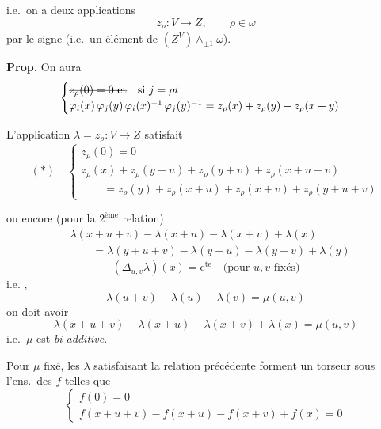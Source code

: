 \documentclass[11pt,a4paper]{article}
\begin{document}
i.e.\ on a deux applications
\[
z_\rho : V \longrightarrow Z, \qquad \rho \in \omega
\]
 par le signe (i.e.\ un élément de $(Z^V) \wedge_{\pm 1} \omega$). 

\textbf{Prop.} On aura
\[
\begin{cases}
\text{\struck{$z_\rho(0) = 0$ et}} \quad \text{si } j = \rho i\\
\varphi_i(x)\, \varphi_j(y)\, \varphi_i(x)^{-1}\, \varphi_j(y)^{-1} = z_\rho(x) + z_\rho(y) - z_\rho(x + y)
\end{cases}
\]

L'application $\lambda = z_\rho : V \to Z$ satisfait
\[
(*)\quad
\begin{cases}
z_\rho(0) = 0\\
z_\rho(x) + z_\rho(y + u) + z_\rho(y + v) + z_\rho(x + u + v)\\
\qquad = z_\rho(y) + z_\rho(x + u) + z_\rho(x + v) + z_\rho(y + u + v)
\end{cases}
\]


ou encore (pour la $2^{\text{ème}}$ relation)
\[
\begin{aligned}
&\lambda(x + u + v) - \lambda(x + u) - \lambda(x + v) + \lambda(x)\\
&\qquad = \lambda(y + u + v) - \lambda(y + u) - \lambda(y + v) + \lambda(y)
\end{aligned}
\]
\[
(\Delta_{u,v} \lambda)(x) = \text{c}^{\text{te}} \quad \text{(pour $u, v$ fixés)}
\]
i.e. \struck{\ill{} \ill{}}, 
\[
\lambda(u + v) - \lambda(u) - \lambda(v) = \mu(u, v)
\]
on doit avoir
\[
\boxed{\lambda(x + u + v) - \lambda(x + u) - \lambda(x + v) + \lambda(x) = \mu(u, v)}
\]
i.e.\ $\mu$ est \emph{bi-additive}. 

Pour $\mu$ fixé, les $\lambda$ satisfaisant  la relation précédente forment un torseur sous l'ens.\ des $f$ telles que
\[
\begin{cases}
f(0) = 0\\
f(x + u + v) - f(x + u) - f(x + v) + f(x) = 0
\end{cases}
\]
\end{document}
